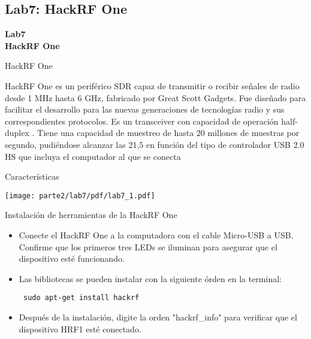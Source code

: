 \subsection{Lab7: HackRF One}
\begin{frame}{}


\bfseries{\textrm{\LARGE Lab7\\ \Large HackRF One}}
\raggedright
\end{frame}

\begin{frame}{HackRF One}



HackRF One es un periférico SDR capaz de transmitir o recibir señales de radio desde 1 MHz hasta 6 GHz, fabricado por Great Scott Gadgets. Fue diseñado para facilitar el  desarrollo para las nuevas generaciones de tecnologías radio y sus correspondientes protocolos. Es un transceiver con capacidad de operación half-duplex .  Tiene una capacidad de muestreo de hasta 20 millones de muestras por segundo, pudiéndose alcanzar las 21,5 en función del tipo de controlador USB 2.0 HS que incluya el computador al que se conecta

\end{frame}

\begin{frame}{Características}

\begin{center}
\vspace{-0.3cm}
\texttt{[image: parte2/lab7/pdf/lab7\_1.pdf]}
\end{center}

\end{frame}

\begin{frame}{Instalación de  herramientas de la HackRF One}

\begin{itemize}
    \item
    {Conecte el HackRF One a la computadora con el cable Micro-USB a USB. Confirme que los primeros tres  LEDs se iluminan para asegurar que el dispositivo esté funcionando.}
    \item
    {Las bibliotecas se pueden instalar con la siguiente órden en la terminal:
    
    \begin{block}{}
    \texttt{
    sudo apt-get install hackrf}
    \end{block}
    }
    \item
    {Después de la instalación, digite la orden "hackrf\_info" para verificar que el dispositivo HRF1 esté conectado.}
    
\end{itemize}
\end{frame}

